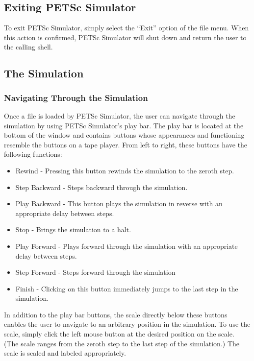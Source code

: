 \subsection{Exiting PETSc Simulator}

To exit PETSc Simulator, simply select the ``Exit'' option of the file menu.  When this action is confirmed, PETSc Simulator will shut down and return the user to the calling shell.

\subsection{The Simulation}

\subsubsection{Navigating Through the Simulation}

Once a file is loaded by PETSc Simulator, the user can navigate through the simulation by using PETSc Simulator's play bar.  The play bar is located at the bottom of the window and contains buttons whose appearances and functioning resemble the buttons on a tape player.  From left to right, these buttons have the following functions:
\begin{itemize}
\item Rewind - Pressing this button rewinds the simulation to the zeroth step.
\item Step Backward - Steps backward through the simulation.
\item Play Backward - This button plays the simulation in reverse with an appropriate delay between steps.  
\item Stop - Brings the simulation to a halt.
\item Play Forward - Plays forward through the simulation with an appropriate delay between steps.
\item Step Forward - Steps forward through the simulation
\item Finish - Clicking on this button immediately jumps to the last step in the simulation.
\end{itemize}

In addition to the play bar buttons, the scale directly below these buttons enables the user to navigate to an arbitrary position in the simulation.  To use the scale, simply click the left mouse button at the desired position on the scale.  (The scale ranges from the zeroth step to the last step of the simulation.)  The scale is scaled and labeled appropriately.

